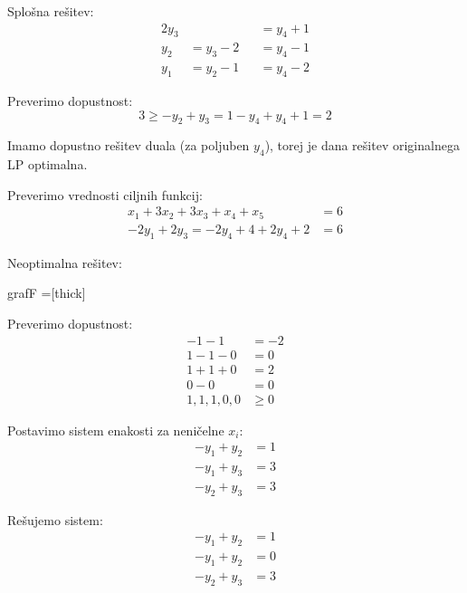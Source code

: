 \documentclass[14pt]{extarticle}
\begin{document}
Splošna rešitev:
\begin{alignat*}{2}
    y_3 &&&= y_4 + 1 \\
    y_2 &= y_3 - 2 &&= y_4 - 1 \\
    y_1 &= y_2 - 1 &&= y_4 - 2
\end{alignat*}

Preverimo dopustnost:
$$
3 \ge -y_2 + y_3 = 1 - y_4 + y_4 + 1 = 2
$$

Imamo dopustno rešitev duala (za poljuben $y_4$), torej je dana rešitev originalnega LP optimalna.

Preverimo vrednosti ciljnih funkcij:
\begin{align*}
x_1 + 3x_2 + 3x_3 + x_4 + x_5 &= 6 \\
-2y_1 + 2y_3 = -2y_4 + 4 + 2y_4 + 2 &= 6
\end{align*}

\clearpage

Neoptimalna rešitev:

\begin{razvoz}{grafF}
    =[thick]


\end{razvoz}

Preverimo dopustnost:
\begin{align*}
    -1 - 1 &= -2 \\
    1 - 1 - 0 &= 0 \\
    1 + 1 + 0 &= 2 \\
    0 - 0 &= 0 \\
    1, 1, 1, 0, 0 &\ge 0
\end{align*}

Postavimo sistem enakosti za neničelne $x_i$:
\begin{align*}
    -y_1 + y_2 &= 1 \\
    -y_1 + y_3 &= 3 \\
    -y_2 + y_3 &= 3
\end{align*}

Rešujemo sistem:
\begin{align*}
    -y_1 + y_2 &= 1 \\
    -y_1 + y_2 &= 0 \\
    -y_2 + y_3 &= 3
\end{align*}
\end{document}
